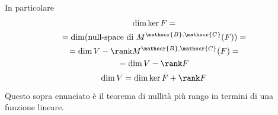 In particolare 
\begin{multline*}
 \dim\ker F = \\
 = \dim(\text{null-space di } M^{\mathscr{B}, \mathscr{C}}(F))=\\
 = \dim V - \rank M^{\mathscr{B}, \mathscr{C}}(F) =\\
 = \dim V- \rank F 
\end{multline*}
\[
	\dim V = \dim \ker F + \rank F
\]

Questo sopra enunciato è il teorema di nullità più rango in termini di una funzione lineare.


